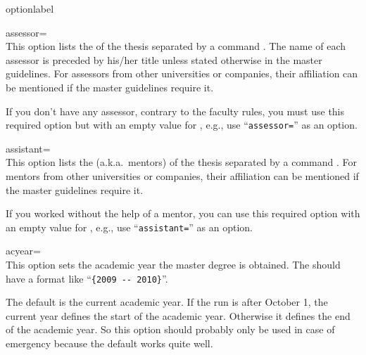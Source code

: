 \begin{labelled}{optionlabel}
\item[assessor=\meta{assessors}]
  \\
  This option lists the  of the thesis separated by a
  command . The name of each assessor is preceded by his/her
  title unless stated otherwise in the master guidelines. For assessors
  from other universities or companies, their affiliation can be mentioned
  if the master guidelines require it.

   If you don't have any assessor, contrary to the
  faculty rules, you must use this required option but with an empty value
  for , e.g., use ``\verb"assessor="'' as an option.

\item[assistant=\meta{assistants}]
  \\
  This option lists the  (a.k.a.\ mentors) of the thesis
  separated by a command . For mentors from other universities
  or companies, their affiliation can be mentioned if the master guidelines
  require it.

   If you worked without the help of a mentor, you can
  use this required option with an empty value for , e.g.,
  use ``\verb"assistant="'' as an option.

\item[acyear=\meta{acyear}]\\
  This option sets the academic year the master degree is obtained. The
   should have a format like ``\verb*"{2009 -- 2010}"''.

  The default is the current academic year. If the  run is
  after October 1, the current year defines the start of the academic year.
  Otherwise it defines the end of the academic year. So this option should
  probably only be used in case of emergency because the default works quite
  well.
\end{labelled}

